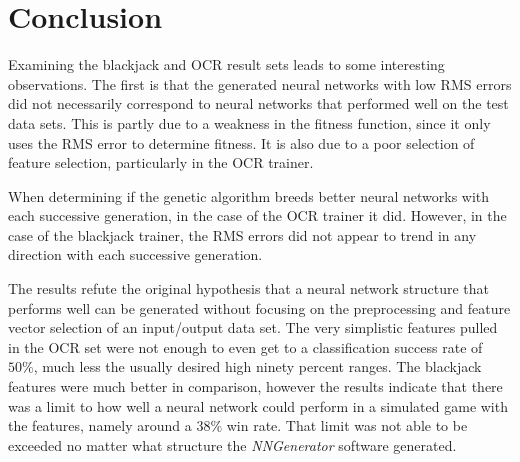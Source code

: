 \section{Conclusion}

Examining the blackjack and OCR result sets leads to some interesting observations.
The first is that the generated neural networks with low RMS errors did not necessarily correspond to neural networks that performed well on the test data sets.
This is partly due to a weakness in the fitness function, since it only uses the RMS error to determine fitness.
It is also due to a poor selection of feature selection, particularly in the OCR trainer.

When determining if the genetic algorithm breeds better neural networks with each successive generation, in the case of the OCR trainer it did.
However, in the case of the blackjack trainer, the RMS errors did not appear to trend in any direction with each successive generation.

The results refute the original hypothesis that a neural network structure that performs well can be generated without focusing on the preprocessing and feature vector selection of an input/output data set.
The very simplistic features pulled in the OCR set were not enough to even get to a classification success rate of $50\%$, much less the usually desired high ninety percent ranges.
The blackjack features were much better in comparison, however the results indicate that there was a limit to how well a neural network could perform in a simulated game with the features, namely around a $38\%$ win rate.
That limit was not able to be exceeded no matter what structure the {\it NNGenerator} software generated. 
 


